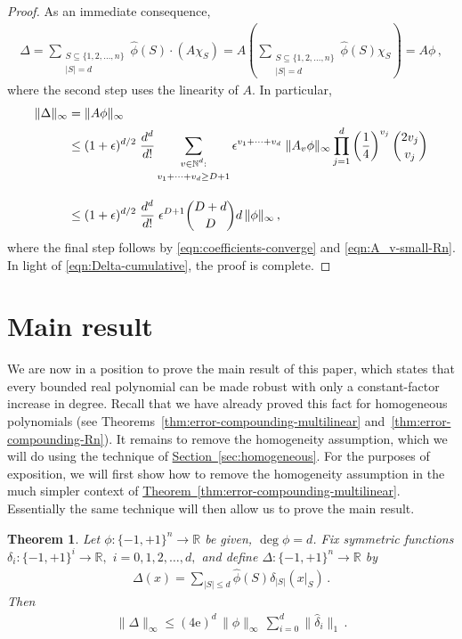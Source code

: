 \documentclass[10pt]{article}
\newtheorem{theorem}{Theorem}[section]
\theoremstyle{definition}
\numberwithin{equation}{section}
\newcommand{\R}{{\mathbb R}}
\newcommand{\expref}[2]{\texorpdfstring{\hyperref[#2]{#1~\ref{#2}}}{#1~\ref{#2}}}
\newcommand{\moo}{\{-1,+1\}}
\newcommand{\moon}{\moo^n}
\newcommand{\oneton}{\{1,2,\dots,n\}}
\newcommand{\PARENS}[1]{\left(#1\right)}
\newcommand{\e}{\mathrm{e}}  %
\begin{document}
\begin{proof}
As an immediate consequence, 
\begin{align*}
\Delta = \sum_{\substack{S\subseteq\oneton\\|S|=d}}
	\hat\phi(S)\cdot (A\chi_S)
       = A
	   \PARENS{
	   \sum_{\substack{S\subseteq\oneton\\|S|=d}}
	       ^{\phantom{\substack{|\\S\subseteq}}}
	   \hat\phi(S)\chi_S}
       = A\phi\,,
\end{align*}
where the second step uses the linearity of $A$. In 
particular,
\begin{align*}
\|\Delta\|_\infty &=\|A\phi\|_\infty \\
&\leq (1+\epsilon)^{d/2}\;\frac{d^d}{d!}\sum_{\substack{\rule{0mm}{2mm}v\in\mathbb
N^d:\\\rule{0mm}{3mm}v_1+\cdots+v_d\geq D+1}} 
 \epsilon^{v_1+\cdots+v_d}
  \; \|A_v\phi\|_\infty\prod_{j=1}^d
  \PARENS{\frac14}^{v_j}{2v_j\choose v_j}\\
&\rule{0mm}{9mm}\leq
(1+\epsilon)^{d/2}\;\frac{d^d}{d!}\;\epsilon^{D+1}{D+d\choose D}
d\,\|\phi\|_\infty\,,
\end{align*}
where the final step follows by
\eqref{eqn:coefficients-converge} and
\eqref{eqn:A_v-small-Rn}.
In light of \eqref{eqn:Delta-cumulative}, the proof is
complete.
\end{proof}




\section{Main result}
\label{sec:main}


We are now in a position to prove the main result of this
paper, which states that every bounded real polynomial 
can be made robust with only a constant-factor increase
in degree. Recall that we have already proved this fact for
homogeneous polynomials (see
Theorems~\ref{thm:error-compounding-multilinear}
and~\ref{thm:error-compounding-Rn}). It remains to
remove the homogeneity assumption, which we will do using
the technique of \expref{Section}{sec:homogeneous}.
For the purposes of exposition, we will first show how
to remove the homogeneity assumption in the much
simpler context of
\expref{Theorem}{thm:error-compounding-multilinear}.
Essentially the same technique will then allow us to
prove the main result.

\begin{theorem}
\label{thm:cumulative-error-nonhomog-multilinear}
Let $\phi\colon\moon\to\R$ be given, $\deg\phi=d$.
Fix symmetric functions $\delta_i\colon\moo^i\to\R,$
$i=0,1,2,\dots,d,$
and define $\Delta\colon\moon\to\R$ by
\begin{align*}
\Delta(x)=\sum_{|S|\leq d}
\hat\phi(S)\delta_{|S|}(x|_S)\,.
\end{align*}
Then
\begin{align*}
\|\Delta\|_\infty \leq (4\e)^d\, \|\phi\|_\infty
\,\sum_{i=0}^d \|\hat\delta_i\|_1\,.
\end{align*}
\end{theorem}
\end{document}
